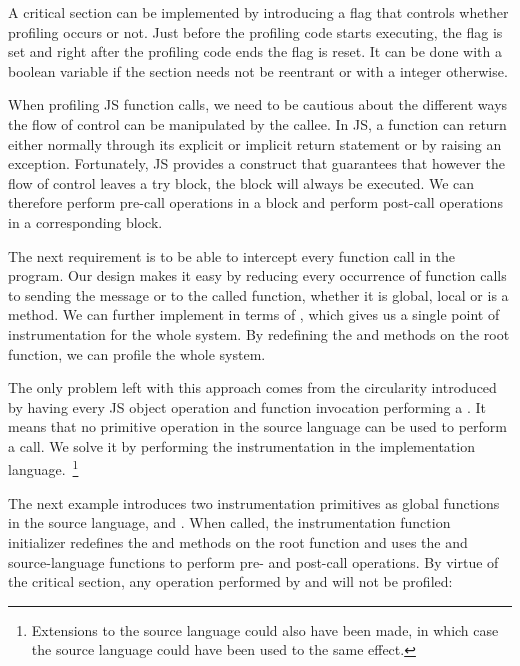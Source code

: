 A critical section can be implemented by introducing a flag that controls
whether profiling occurs or not. Just before the profiling code starts
executing, the flag is set and right after the profiling code ends the flag is
reset. It can be done with a boolean variable if the section needs not be
reentrant or with a integer otherwise.

When profiling JS function calls, we need to be cautious about the different
ways the flow of control can be manipulated by the callee. In JS, a function
can return either normally through its explicit or implicit return statement or
by raising an exception. Fortunately, JS provides a  construct that
guarantees that however the flow of control leaves a try block, the 
block will always be executed. We can therefore perform pre-call operations in
a  block and perform post-call operations in a corresponding
 block.

The next requirement is to be able to intercept every function call in the
program. Our design makes it easy by reducing every occurrence of function calls
to sending the message  or  to the called function, whether
it is global, local or is a method. We can further implement  in terms
of , which gives us a single point of instrumentation for the whole
system. By redefining the  and  methods on the root function,
we can profile the whole system.

The only problem left with this approach comes from the circularity introduced by
having every JS object operation and function invocation performing a
. It means that no primitive operation in the source language can be
used to perform a call. We solve it by performing the instrumentation in the
implementation language.~\footnote{Extensions to the source language could also
have been made, in which case the source language could have been used to the
same effect.}

The next example introduces two instrumentation primitives as global functions
in the source language,  and
. When called, the instrumentation function
initializer redefines the  and  methods on the root function
and uses the  and  source-language functions to perform
pre- and post-call operations.  By virtue of the critical section, any operation
performed by  and  will not be profiled:

